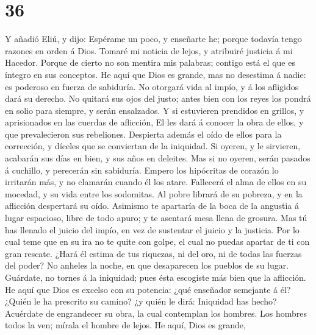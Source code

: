 \hypertarget{section-35}{%
\section{36}\label{section-35}}

 Y añadió Eliú, y dijo:  Espérame un poco, y
enseñarte he; porque todavía tengo razones en orden á Dios.
 Tomaré mi noticia de lejos, y atribuiré justicia á mi
Hacedor.  Porque de cierto no son mentira mis palabras;
contigo está el que es íntegro en sus conceptos.  He aquí
que Dios es grande, mas no desestima á nadie: es poderoso en fuerza de
sabiduría.  No otorgará vida al impío, y á los afligidos
dará su derecho.  No quitará sus ojos del justo; antes
bien con los reyes los pondrá en solio para siempre, y serán ensalzados.
 Y si estuvieren prendidos en grillos, y aprisionados en
las cuerdas de aflicción,  El les dará á conocer la obra
de ellos, y que prevalecieron sus rebeliones.  Despierta
además el oído de ellos para la corrección, y díceles que se conviertan
de la iniquidad.  Si oyeren, y le sirvieren, acabarán sus
días en bien, y sus años en deleites.  Mas si no oyeren,
serán pasados á cuchillo, y perecerán sin sabiduría. 
Empero los hipócritas de corazón lo irritarán más, y no clamarán cuando
él los atare.  Fallecerá el alma de ellos en su mocedad,
y su vida entre los sodomitas.  Al pobre librará de su
pobreza, y en la aflicción despertará su oído.  Asimismo
te apartaría de la boca de la angustia á lugar espacioso, libre de todo
apuro; y te asentará mesa llena de grosura.  Mas tú has
llenado el juicio del impío, en vez de sustentar el juicio y la
justicia.  Por lo cual teme que en su ira no te quite con
golpe, el cual no puedas apartar de ti con gran rescate. 
¿Hará él estima de tus riquezas, ni del oro, ni de todas las fuerzas del
poder?  No anheles la noche, en que desaparecen los
pueblos de su lugar.  Guárdate, no tornes á la iniquidad;
pues ésta escogiste más bien que la aflicción.  He aquí
que Dios es excelso con su potencia: ¿qué enseñador semejante á él?
 ¿Quién le ha prescrito su camino? ¿y quién le dirá:
Iniquidad has hecho?  Acuérdate de engrandecer su obra,
la cual contemplan los hombres.  Los hombres todos la
ven; mírala el hombre de lejos.  He aquí, Dios es grande,
